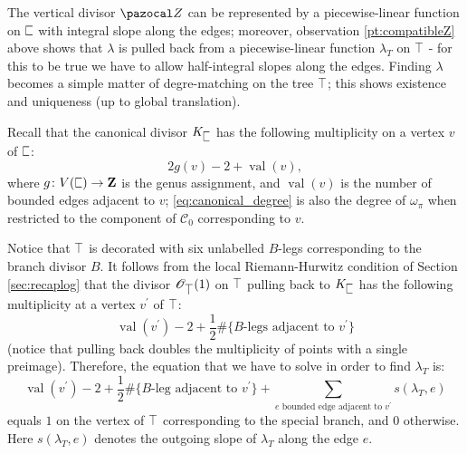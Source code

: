 \documentclass{compositio}
\newcommand{\tropC}{\scalebox{0.8}[1.3]{$\sqsubset$}}
\newcommand{\tropT}{\scalebox{0.9}[1.2]{$\top$}}
\newcommand{\OO}{\mathcal O}
\renewcommand{\to}{\rightarrow}
\theoremstyle{plain}
\theoremstyle{definition}
\theoremstyle{remark}
\begin{document}
 The vertical divisor $\pazocal Z$ can be represented by a piecewise-linear function on $\tropC$ with integral slope along the edges; moreover, observation \ref{pt:compatibleZ} above shows that $\lambda$ is pulled back from a piecewise-linear function $\lambda_T$ on $\tropT$ - for this to be true we have to allow half-integral slopes along the edges. Finding $\lambda$ becomes a simple matter of degre-matching on the tree $\tropT$; this shows existence and uniqueness (up to global translation).
 
 Recall that the canonical divisor $K_{\tropC}$ has the following multiplicity on a vertex $v$ of $\tropC$:
 \begin{equation}\label{eq:canonical_degree}
 2g(v)-2+\operatorname{val}(v),                                                                                                                                                                                                                                                                                                                                                                                                                                                                                                                                                                                                                                                                                                                                                                                                                                                                                                                                                                                                                                                             \end{equation}
where $g\colon V(\tropC)\to\mathbb Z$ is the genus assignment, and $\operatorname{val}(v)$ is the number of bounded edges adjacent to $v$; \eqref{eq:canonical_degree} is also the degree of $\omega_\pi$ when restricted to the component of $\mathcal C_0$ corresponding to $v$.

Notice that $\tropT$ is decorated with six unlabelled $B$-legs corresponding to the branch divisor $B$. It follows from the local Riemann-Hurwitz condition of Section \ref{sec:recaplog} that the divisor $\OO_{\tropT}(1)$ on $\tropT$ pulling back to $K_{\tropC}$ has the following multiplicity at a vertex $v^\prime$ of $\tropT$:
 \[ \operatorname{val}(v^\prime)-2+\frac{1}{2}\#\{B\text{-legs adjacent to } v^\prime\} \]
(notice that pulling back doubles the multiplicity of points with a single preimage). Therefore, the equation that we have to solve in order to find $\lambda_T$ is:
 \begin{equation}\label{eqn:Dv}
  \operatorname{val}(v^\prime)-2+\frac{1}{2}\#\{B\text{-leg adjacent to } v^\prime\}+\sum_{e\text{ bounded edge adjacent to } v^\prime}s(\lambda_T,e)
 \end{equation}
 equals $1$ on the vertex of $\tropT$ corresponding to the special branch, and $0$ otherwise. Here $s(\lambda_T,e)$ denotes the outgoing slope of $\lambda_T$ along the edge $e$.
\end{document}
